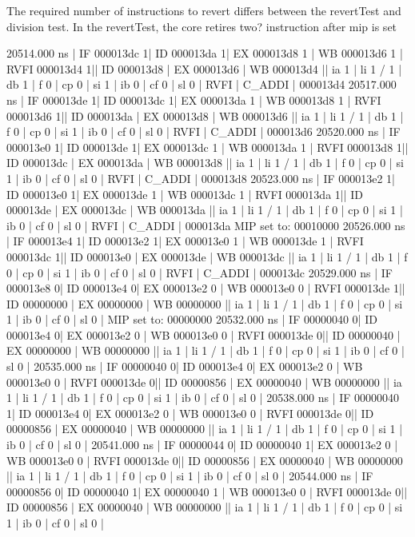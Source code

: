 The required number of instructions to revert differs between the revertTest and division test. In the revertTest, the core retires two? instruction after mip is set
\begin{terminal}
   20514.000 ns | IF 000013dc  1| ID 000013da 1| EX 000013d8 1 | WB 000013d6 1 | RVFI 000013d4 1|| ID 000013d8 | EX 000013d6 | WB 000013d4 || ia 1 | li 1 / 1 | db 1 | f 0 | cp 0 | si 1 | ib 0 | cf 0 | sl 0 | RVFI | C_ADDI   | 000013d4
   20517.000 ns | IF 000013de  1| ID 000013dc 1| EX 000013da 1 | WB 000013d8 1 | RVFI 000013d6 1|| ID 000013da | EX 000013d8 | WB 000013d6 || ia 1 | li 1 / 1 | db 1 | f 0 | cp 0 | si 1 | ib 0 | cf 0 | sl 0 | RVFI | C_ADDI   | 000013d6
   20520.000 ns | IF 000013e0  1| ID 000013de 1| EX 000013dc 1 | WB 000013da 1 | RVFI 000013d8 1|| ID 000013dc | EX 000013da | WB 000013d8 || ia 1 | li 1 / 1 | db 1 | f 0 | cp 0 | si 1 | ib 0 | cf 0 | sl 0 | RVFI | C_ADDI   | 000013d8
   20523.000 ns | IF 000013e2  1| ID 000013e0 1| EX 000013de 1 | WB 000013dc 1 | RVFI 000013da 1|| ID 000013de | EX 000013dc | WB 000013da || ia 1 | li 1 / 1 | db 1 | f 0 | cp 0 | si 1 | ib 0 | cf 0 | sl 0 | RVFI | C_ADDI   | 000013da
MIP set to: 00010000
   20526.000 ns | IF 000013e4  1| ID 000013e2 1| EX 000013e0 1 | WB 000013de 1 | RVFI 000013dc 1|| ID 000013e0 | EX 000013de | WB 000013dc || ia 1 | li 1 / 1 | db 1 | f 0 | cp 0 | si 1 | ib 0 | cf 0 | sl 0 | RVFI | C_ADDI   | 000013dc
   20529.000 ns | IF 000013e8  0| ID 000013e4 0| EX 000013e2 0 | WB 000013e0 0 | RVFI 000013de 1|| ID 00000000 | EX 00000000 | WB 00000000 || ia 1 | li 1 / 1 | db 1 | f 0 | cp 0 | si 1 | ib 0 | cf 0 | sl 0 |
MIP set to: 00000000
   20532.000 ns | IF 00000040  0| ID 000013e4 0| EX 000013e2 0 | WB 000013e0 0 | RVFI 000013de 0|| ID 00000040 | EX 00000000 | WB 00000000 || ia 1 | li 1 / 1 | db 1 | f 0 | cp 0 | si 1 | ib 0 | cf 0 | sl 0 |
   20535.000 ns | IF 00000040  0| ID 000013e4 0| EX 000013e2 0 | WB 000013e0 0 | RVFI 000013de 0|| ID 00000856 | EX 00000040 | WB 00000000 || ia 1 | li 1 / 1 | db 1 | f 0 | cp 0 | si 1 | ib 0 | cf 0 | sl 0 |
   20538.000 ns | IF 00000040  1| ID 000013e4 0| EX 000013e2 0 | WB 000013e0 0 | RVFI 000013de 0|| ID 00000856 | EX 00000040 | WB 00000000 || ia 1 | li 1 / 1 | db 1 | f 0 | cp 0 | si 1 | ib 0 | cf 0 | sl 0 |
   20541.000 ns | IF 00000044  0| ID 00000040 1| EX 000013e2 0 | WB 000013e0 0 | RVFI 000013de 0|| ID 00000856 | EX 00000040 | WB 00000000 || ia 1 | li 1 / 1 | db 1 | f 0 | cp 0 | si 1 | ib 0 | cf 0 | sl 0 |
   20544.000 ns | IF 00000856  0| ID 00000040 1| EX 00000040 1 | WB 000013e0 0 | RVFI 000013de 0|| ID 00000856 | EX 00000040 | WB 00000000 || ia 1 | li 1 / 1 | db 1 | f 0 | cp 0 | si 1 | ib 0 | cf 0 | sl 0 |

\end{terminal}
